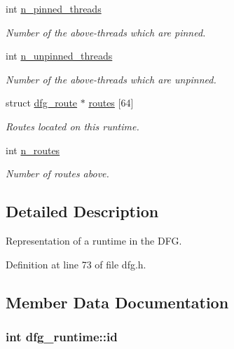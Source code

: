 \begin{DoxyCompactItemize}
int \hyperlink{structdfg__runtime_acb3779eccb9614f48771aeb3e16394bc}{n\-\_\-pinned\-\_\-threads}
\begin{DoxyCompactList}\small\item\em Number of the above-\/threads which are pinned. \end{DoxyCompactList}\item 
int \hyperlink{structdfg__runtime_ae9fb600da8228ad88cc06dfd863d980f}{n\-\_\-unpinned\-\_\-threads}
\begin{DoxyCompactList}\small\item\em Number of the above-\/threads which are unpinned. \end{DoxyCompactList}\item 
struct \hyperlink{structdfg__route}{dfg\-\_\-route} $\ast$ \hyperlink{structdfg__runtime_a1ad88caaa574b644201c1abccd94066a}{routes} \mbox{[}64\mbox{]}
\begin{DoxyCompactList}\small\item\em Routes located on this runtime. \end{DoxyCompactList}\item 
int \hyperlink{structdfg__runtime_a410c8ded04d9b53061dbb939446ac26a}{n\-\_\-routes}
\begin{DoxyCompactList}\small\item\em Number of routes above. \end{DoxyCompactList}\end{DoxyCompactItemize}


\subsection{Detailed Description}
Representation of a runtime in the D\-F\-G. 

Definition at line 73 of file dfg.\-h.



\subsection{Member Data Documentation}
\hypertarget{structdfg__runtime_ab9978989f372b69d34ef5e186a5db881}{
\subsubsection[{id}]{\setlength{\rightskip}{0pt plus 5cm}int dfg\-\_\-runtime\-::id}}\label{structdfg__runtime_ab9978989f372b69d34ef5e186a5db881}


